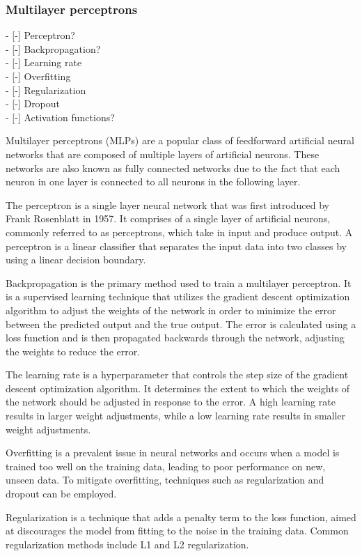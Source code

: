 \subsubsection{Multilayer perceptrons}
- [-] Perceptron?\\
- [-] Backpropagation?\\
- [-] Learning rate\\
- [-] Overfitting\\
- [-] Regularization\\
- [-] Dropout\\
- [-] Activation functions?

Multilayer perceptrons (MLPs) are a popular class of feedforward artificial neural networks that are composed of multiple layers of artificial neurons. These networks are also known as fully connected networks due to the fact that each neuron in one layer is connected to all neurons in the following layer.

The perceptron is a single layer neural network that was first introduced by Frank Rosenblatt in 1957. It comprises of a single layer of artificial neurons, commonly referred to as perceptrons, which take in input and produce output. A perceptron is a linear classifier that separates the input data into two classes by using a linear decision boundary.

Backpropagation is the primary method used to train a multilayer perceptron. It is a supervised learning technique that utilizes the gradient descent optimization algorithm to adjust the weights of the network in order to minimize the error between the predicted output and the true output. The error is calculated using a loss function and is then propagated backwards through the network, adjusting the weights to reduce the error.

The learning rate is a hyperparameter that controls the step size of the gradient descent optimization algorithm. It determines the extent to which the weights of the network should be adjusted in response to the error. A high learning rate results in larger weight adjustments, while a low learning rate results in smaller weight adjustments.

Overfitting is a prevalent issue in neural networks and occurs when a model is trained too well on the training data, leading to poor performance on new, unseen data. To mitigate overfitting, techniques such as regularization and dropout can be employed.

Regularization is a technique that adds a penalty term to the loss function, aimed at discourages the model from fitting to the noise in the training data. Common regularization methods include L1 and L2 regularization.

